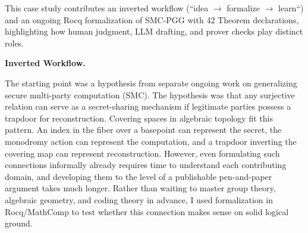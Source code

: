 \documentclass[11pt,a4paper]{article}
\begin{document}
%


This case study contributes an inverted workflow (``idea $\to$ formalize $\to$
learn``) and an ongoing Rocq formalization of SMC-PGG with 42 Theorem
declarations, highlighting how human judgment, LLM drafting, and prover checks
play distinct roles.

\noindent\textbf{Inverted Workflow.}

The starting point was a hypothesis from separate ongoing work on generalizing
secure multi-party computation (SMC). The hypothesis was that any surjective
relation can serve as a secret-sharing mechanism if legitimate parties possess a
trapdoor for reconstruction. Covering spaces in algebraic topology fit this
pattern. An index in the fiber over a basepoint can represent the secret, the
monodromy action can represent the computation, and a trapdoor inverting the
covering map can represent reconstruction. However, even formulating such
connections informally already requires time to understand each contributing
domain, and developing them to the level of a publishable pen-and-paper
argument takes much longer. Rather than waiting to master group theory,
algebraic geometry, and coding theory in advance, I used formalization in
Rocq/MathComp to test whether this connection makes sense on solid logical
ground.
\end{document}
